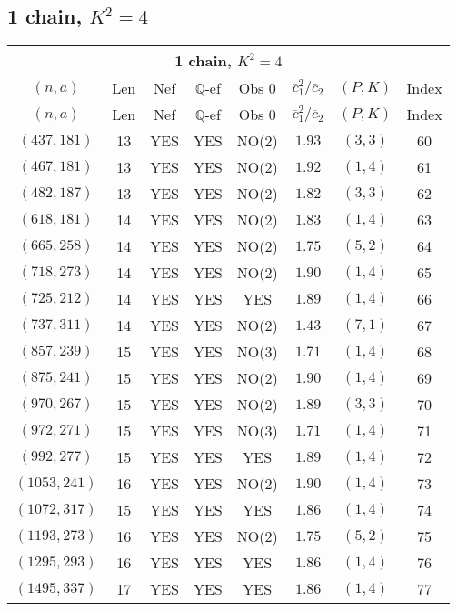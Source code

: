 \subsection{1 chain, $K^2 = 4$}
\begin{longtable}{|c|c|c|c|c|c|c|c|}
\hline
\multicolumn{8}{|c|}{1 chain, $K^2 = 4$}\\
\hline
$(n,a)$ & Len & Nef & $\mathbb Q$-ef & Obs 0 & $\overline c_1^2 / \overline c_2$ & $(P,K)$ & Index\\
\hline
\endfirsthead

\hline
$(n,a)$ & Len & Nef & $\mathbb Q$-ef & Obs 0 & $\overline c_1^2 / \overline c_2$ & $(P,K)$ & Index\\
\hline
\endhead
\hline
\endfoot

$(437,181)$ & 13 & YES & YES & NO(2) & $1.93$ & $(3,3)$ & 60\\
$(467,181)$ & 13 & YES & YES & NO(2) & $1.92$ & $(1,4)$ & 61\\
$(482,187)$ & 13 & YES & YES & NO(2) & $1.82$ & $(3,3)$ & 62\\
$(618,181)$ & 14 & YES & YES & NO(2) & $1.83$ & $(1,4)$ & 63\\
$(665,258)$ & 14 & YES & YES & NO(2) & $1.75$ & $(5,2)$ & 64\\
$(718,273)$ & 14 & YES & YES & NO(2) & $1.90$ & $(1,4)$ & 65\\
$(725,212)$ & 14 & YES & YES & YES & $1.89$ & $(1,4)$ & 66\\
$(737,311)$ & 14 & YES & YES & NO(2) & $1.43$ & $(7,1)$ & 67\\
$(857,239)$ & 15 & YES & YES & NO(3) & $1.71$ & $(1,4)$ & 68\\
$(875,241)$ & 15 & YES & YES & NO(2) & $1.90$ & $(1,4)$ & 69\\
$(970,267)$ & 15 & YES & YES & NO(2) & $1.89$ & $(3,3)$ & 70\\
$(972,271)$ & 15 & YES & YES & NO(3) & $1.71$ & $(1,4)$ & 71\\
$(992,277)$ & 15 & YES & YES & YES & $1.89$ & $(1,4)$ & 72\\
$(1053,241)$ & 16 & YES & YES & NO(2) & $1.90$ & $(1,4)$ & 73\\
$(1072,317)$ & 15 & YES & YES & YES & $1.86$ & $(1,4)$ & 74\\
$(1193,273)$ & 16 & YES & YES & NO(2) & $1.75$ & $(5,2)$ & 75\\
$(1295,293)$ & 16 & YES & YES & YES & $1.86$ & $(1,4)$ & 76\\
$(1495,337)$ & 17 & YES & YES & YES & $1.86$ & $(1,4)$ & 77
\end{longtable}
